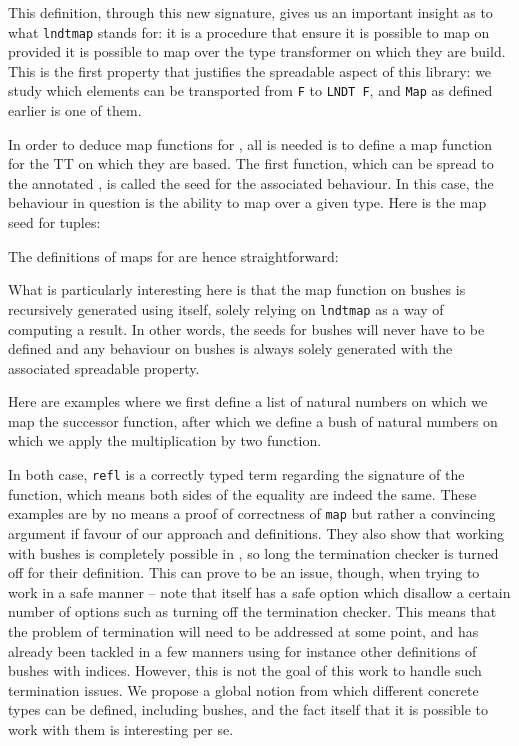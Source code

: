 \documentclass[a4paper,UKenglish,cleveref, autoref, thm-restate]{lipics}
\begin{document}
\lndtmap

This definition, through this new signature, gives us an important insight as to what \texttt{lndtmap} stands for: it is a procedure that ensure it is possible to map on \linears provided it is possible to map over the type transformer on which they are build. This is the first property that justifies the spreadable aspect of this library: we study which elements can be transported from \texttt{F} to \texttt{LNDT F}, and \texttt{Map} as defined earlier is one of them.

 In order to deduce map functions for \linears, all is needed is to define a map function for the TT on which they are based. The first function, which can be spread to the annotated \linear, is called the seed for the associated behaviour. In this case, the behaviour in question is the ability to map over a given type. Here is the map seed for tuples:

\tuplesmap

The definitions of maps for \linears are hence straightforward:

\lndtmaps

What is particularly interesting here is that the map function on bushes is recursively generated using itself, solely relying on \texttt{lndtmap} as a way of computing a result. In other words, the seeds for bushes will never have to be defined and any behaviour on bushes is always solely generated with the associated spreadable property.

 Here are examples where we first define a list of natural numbers on which we map the successor function, after which we define a bush of natural numbers on which we apply the multiplication by two function.

\firstexample

 In both case, \texttt{refl} is a correctly typed term regarding the signature of the function, which means both sides of the equality are indeed the same. These examples are by no means a proof of correctness of \texttt{map} but rather a convincing argument if favour of our approach and definitions. They also show that working with bushes is completely possible in \agda, so long the termination checker is turned off for their definition. This can prove to be an issue, though, when trying to work in a safe manner -- note that \agda itself has a safe option which disallow a certain number of options such as turning off the termination checker. This means that the problem of termination will need to be addressed at some point, and has already been tackled in a few manners using for instance other definitions of bushes with indices. However, this is not the goal of this work to handle such termination issues. We propose a global notion from which different concrete types can be defined, including bushes, and the fact itself that it is possible to work with them is interesting per se.
\end{document}
